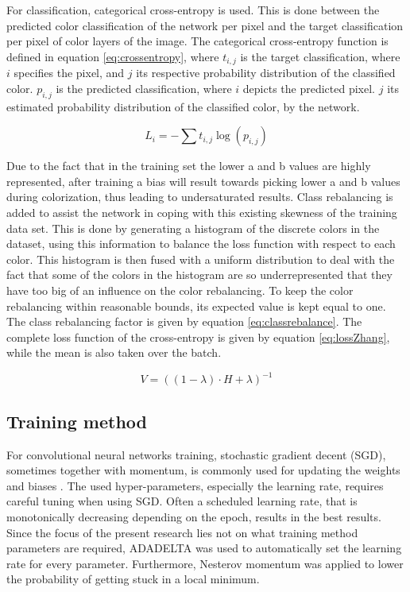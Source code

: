 For classification, categorical cross-entropy is used. This is done between the predicted color classification of the network per pixel and the target classification per pixel of color layers of the image. The categorical cross-entropy function is defined in equation \ref{eq:crossentropy}, where $t_{i,j}$ is the target classification, where $i$ specifies the pixel, and $j$ its respective probability distribution of the classified color. 
$p_{i,j}$ is the predicted classification, where $i$ depicts the predicted pixel. $j$ its estimated probability distribution of the classified color, by the network.

\begin{equation}
\label{eq:crossentropy}
L_{i} = -\sum t_{i,j}\log(p_{i,j})
\end{equation}

Due to the fact that in the training set the lower a and b values are highly represented, after training a bias will result towards picking lower a and b values during colorization, thus leading to undersaturated results. 
Class rebalancing is added to assist the network in coping with this existing skewness of the training data set. This is done by generating a histogram of the discrete colors in the dataset, using this information to balance the loss function with respect to each color. 
This histogram is then fused with a uniform distribution to deal with the fact that some of the colors in the histogram are so underrepresented that they have too big of an influence on the color rebalancing. To keep the color rebalancing within reasonable bounds, its expected value is kept equal to one. 
The class rebalancing factor is given by equation \ref{eq:classrebalance}. The complete loss function of the cross-entropy is given by equation \ref{eq:lossZhang}, while the mean is also taken over the batch.

\begin{equation}\label{eq:classrebalance}
V = ((1 - \lambda)\cdot H + \lambda)^{-1}
\end{equation}
 
\subsection{Training method}
For convolutional neural networks training, stochastic gradient decent (SGD), sometimes together with momentum, is commonly used for updating the weights and biases \cite{IizukaSIGGRAPH2016}\cite{Simonyan}. The used hyper-parameters, especially the learning rate, requires careful tuning when using SGD. Often a scheduled learning rate, that is monotonically decreasing depending on the epoch, results in the best results. Since the focus of the present research lies not on what training method parameters are required, ADADELTA was used to automatically set the learning rate for every parameter\cite{zeiler2012adadelta}. Furthermore, Nesterov momentum was applied to lower the probability of getting stuck in a local minimum\cite{sutskever2013importance}.



